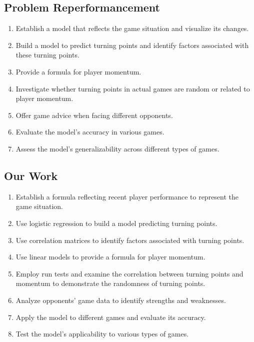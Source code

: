 \documentclass[UTF8]{ctexart} %
\begin{document}
\subsection{\textbf{Problem Reperformancement}}
\begin{enumerate}
    \item Establish a model that reflects the game situation and visualize its changes. 
    \item Build a model to predict turning points and identify factors associated with these turning points.  
    \item Provide a formula for player momentum.   
    \item Investigate whether turning points in actual games are random or related to player momentum.
    \item Offer game advice when facing different opponents.
    \item Evaluate the model's accuracy in various games.
    \item Assess the model's generalizability across different types of games.
\end{enumerate}

\subsection{\textbf{Our Work}}
\begin{enumerate}
    \item Establish a formula reflecting recent player performance to represent the game situation. 
    \item Use logistic regression to build a model predicting turning points.  
    \item Use correlation matrices to identify factors associated with turning points.
    \item Use linear models to provide a formula for player momentum.
    \item Employ run tests and examine the correlation between turning points and momentum to demonstrate the randomness of turning points.
    \item Analyze opponents' game data to identify strengths and weaknesses.
    \item Apply the model to different games and evaluate its accuracy.
    \item Test the model's applicability to various types of games.
\end{enumerate}
\end{document}
